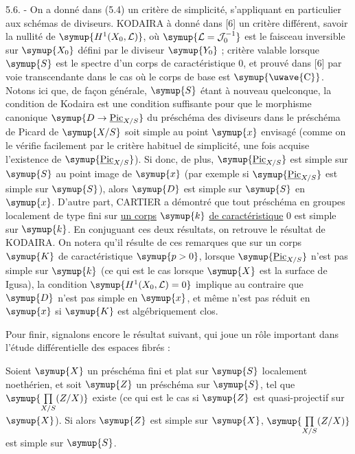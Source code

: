 5.6. - On a donné dans (5.4) un critère de simplicité, s'appliquant en particulier aux
schémas de diviseurs. KODAIRA à donné dans [6] un critère différent, savoir la
nullité de $\symup{H^1(X_0,\mathcal L)}$, où $\symup{\mathcal L=\mathcal J_0^{-1}}$ est le
faisceau inversible sur $\symup{X_0}$ défini par le diviseur $\symup{Y_0}$ ; critère valable
lorsque $\symup{S}$ est le spectre d'un corps de caractéristique 0, et prouvé dans [6]
par voie transcendante dans le cas où le corps de base est $\symup{\text{\uwave{C}}}$. Notons
ici que, de façon générale, $\symup{S}$ étant à nouveau quelconque, la condition de
Kodaira est une condition suffisante pour que le morphisme canonique $\symup{D\to\underline{\operatorname{Pic}}_{X/S}}$ du préschéma des diviseurs dans le préschéma de Picard de $\symup{X/S}$ soit simple au
point $\symup{x}$ envisagé (comme on le vérifie facilement par le critère habituel de
simplicité, une fois acquise l'existence de $\symup{\underline{\operatorname{Pic}}_{X/S}}$). Si
donc, de plus, $\symup{\underline{\operatorname{Pic}}_{X/S}}$ est simple sur $\symup{S}$ au point image de
$\symup{x}$ (par exemple si $\symup{\underline{\operatorname{Pic}}_{X/S}}$ est simple sur $\symup{S}$), alors $\symup{D}$
est simple sur $\symup{S}$ en $\symup{x}$. D'autre part, CARTIER a démontré que tout préschéma
en groupes localement de type fini sur \uline{un corps} $\symup{k}$ \uline{de caractéristique} 0 est
simple sur $\symup{k}$. En conjuguant ces deux résultats, on retrouve le résultat de
KODAIRA. On notera qu'il résulte de ces remarques que sur un corps $\symup{K}$ de
caractéristique $\symup{p>0}$, lorsque $\symup{\underline{\operatorname{Pic}}_{X/S}}$ n'est pas simple sur
$\symup{k}$ (ce qui est le cas lorsque $\symup{X}$ est la surface de Igusa), la condition
$\symup{H^1(X_0,\mathcal L)=0}$ implique au contraire que $\symup{D}$ n'est pas simple en $\symup{x}$,
et même n'est pas réduit en $\symup{x}$ si $\symup{K}$ est algébriquement clos.

Pour finir, signalons encore le résultat suivant, qui joue un rôle important
dans l'étude différentielle des espaces fibrés :

 Soient $\symup{X}$ un préschéma fini et plat sur $\symup{S}$
localement noethérien, et soit $\symup{Z}$ un préschéma sur $\symup{S}$, tel que
$\symup{\prod\limits_{X/S}(Z/X)}$ existe (ce qui est le cas si $\symup{Z}$ est quasi-projectif sur $\symup{X}$).
Si alors $\symup{Z}$ est simple sur $\symup{X}$, $\symup{\prod\limits_{X/S}(Z/X)}$ est simple sur $\symup{S}$.

